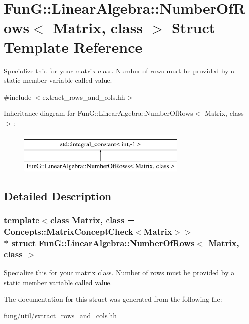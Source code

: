 \hypertarget{structFunG_1_1LinearAlgebra_1_1NumberOfRows}{}\section{FunG\+:\+:Linear\+Algebra\+:\+:Number\+Of\+Rows$<$ Matrix, class $>$ Struct Template Reference}
\label{structFunG_1_1LinearAlgebra_1_1NumberOfRows}


Specialize this for your matrix class. Number of rows must be provided by a static member variable called value.  




{\ttfamily \#include $<$extract\+\_\+rows\+\_\+and\+\_\+cols.\+hh$>$}

Inheritance diagram for FunG\+:\+:Linear\+Algebra\+:\+:Number\+Of\+Rows$<$ Matrix, class $>$\+:\begin{figure}[H]
\begin{center}
\leavevmode
\includegraphics[height=2.000000cm]{structFunG_1_1LinearAlgebra_1_1NumberOfRows}
\end{center}
\end{figure}


\subsection{Detailed Description}
\subsubsection*{template$<$class Matrix, class = Concepts\+::\+Matrix\+Concept\+Check$<$\+Matrix$>$$>$\\*
struct Fun\+G\+::\+Linear\+Algebra\+::\+Number\+Of\+Rows$<$ Matrix, class $>$}

Specialize this for your matrix class. Number of rows must be provided by a static member variable called value. 

The documentation for this struct was generated from the following file\+:\begin{DoxyCompactItemize}
\item 
fung/util/\hyperlink{extract__rows__and__cols_8hh}{extract\+\_\+rows\+\_\+and\+\_\+cols.\+hh}\end{DoxyCompactItemize}
